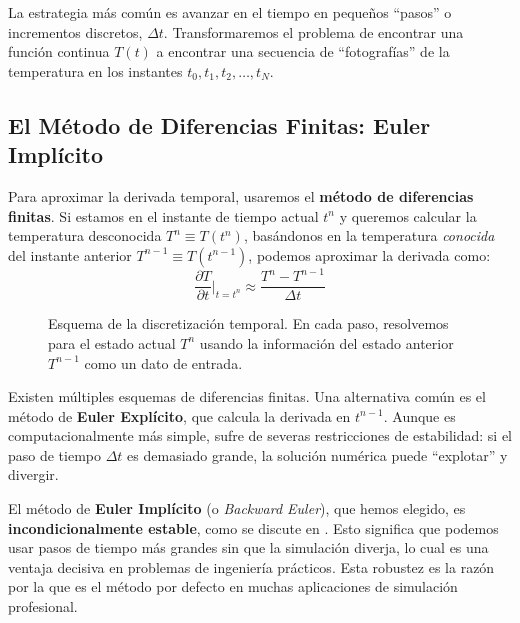 \documentclass[11pt, a4paper]{article}
\begin{document}
La estrategia más común es avanzar en el tiempo en pequeños ``pasos'' o incrementos discretos, $\Delta t$. Transformaremos el problema de encontrar una función continua $T(t)$ a encontrar una secuencia de ``fotografías'' de la temperatura en los instantes $t_0, t_1, t_2, \dots, t_N$.

\subsection{El Método de Diferencias Finitas: Euler Implícito}
Para aproximar la derivada temporal, usaremos el \textbf{método de diferencias finitas}. Si estamos en el instante de tiempo actual $t^n$ y queremos calcular la temperatura desconocida $T^n \equiv T(t^n)$, basándonos en la temperatura \textit{conocida} del instante anterior $T^{n-1} \equiv T(t^{n-1})$, podemos aproximar la derivada como:
\begin{equation}
    \frac{\partial T}{\partial t} \bigg|_{t=t^n} \approx \frac{T^n - T^{n-1}}{\Delta t}
    \label{eq:euler}
\end{equation}

\begin{figure}[h!]
\centering
{}
\caption{Esquema de la discretización temporal. En cada paso, resolvemos para el estado actual $T^n$ usando la información del estado anterior $T^{n-1}$ como un dato de entrada.}
\end{figure}

\begin{notatecnica}
    Existen múltiples esquemas de diferencias finitas. Una alternativa común es el método de \textbf{Euler Explícito}, que calcula la derivada en $t^{n-1}$. Aunque es computacionalmente más simple, sufre de severas restricciones de estabilidad: si el paso de tiempo $\Delta t$ es demasiado grande, la solución numérica puede ``explotar'' y divergir.
    
    El método de \textbf{Euler Implícito} (o \textit{Backward Euler}), que hemos elegido, es \textbf{incondicionalmente estable}, como se discute en \cite{quarteroni2007}. Esto significa que podemos usar pasos de tiempo más grandes sin que la simulación diverja, lo cual es una ventaja decisiva en problemas de ingeniería prácticos. Esta robustez es la razón por la que es el método por defecto en muchas aplicaciones de simulación profesional.
\end{notatecnica}
\end{document}
